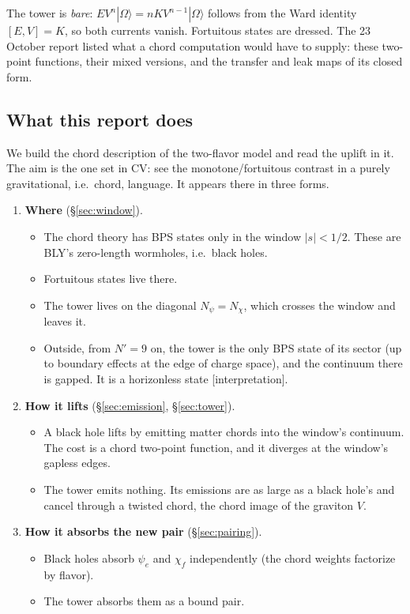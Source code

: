 \documentclass[11pt]{article}
\newcommand{\Np}{N'}
\newcommand{\Om}{|\Omega\rangle}
\newcommand{\tagbox}[2]{\textsf{\small\color{#1}[#2]}}
\newcommand{\INTERP}{\tagbox{cconj}{interpretation}}
\theoremstyle{plain}
\theoremstyle{remark}
\numberwithin{equation}{section}
\begin{document}
The tower is \emph{bare}: $E V^n\Om=nKV^{n-1}\Om$ follows from the Ward identity $[E,V]=K$, so both currents vanish.
Fortuitous states are dressed. The 23 October report listed what a chord computation would have to supply: these two-point
functions, their mixed versions, and the transfer and leak maps of its closed form.

\subsection{What this report does}

We build the chord description of the two-flavor model and read the uplift in it. The aim is the one set in CV: see the
monotone/fortuitous contrast in a purely gravitational, i.e.\ chord, language. It appears there in three forms.

\begin{enumerate}\itemsep2pt
\item \textbf{Where} (\S\ref{sec:window}).
  \begin{itemize}\itemsep1pt
  \item The chord theory has BPS states only in the window $|s|<1/2$. These are BLY's zero-length wormholes, i.e.\ black
    holes.
  \item Fortuitous states live there.
  \item The tower lives on the diagonal $N_\psi=N_\chi$, which crosses the window and leaves it.
  \item Outside, from $\Np=9$ on, the tower is the only BPS state of its sector (up to boundary effects at the edge of
    charge space), and the continuum there is gapped. It is a horizonless state \INTERP.
  \end{itemize}
\item \textbf{How it lifts} (\S\ref{sec:emission}, \S\ref{sec:tower}).
  \begin{itemize}\itemsep1pt
  \item A black hole lifts by emitting matter chords into the window's continuum. The cost is a chord two-point
    function, and it diverges at the window's gapless edges.
  \item The tower emits nothing. Its emissions are as large as a black hole's and cancel through a twisted chord, the chord
    image of the graviton $V$.
  \end{itemize}
\item \textbf{How it absorbs the new pair} (\S\ref{sec:pairing}).
  \begin{itemize}\itemsep1pt
  \item Black holes absorb $\psi_e$ and $\chi_f$ independently (the chord weights factorize by flavor).
  \item The tower absorbs them as a bound pair.
  \end{itemize}
\end{enumerate}
\end{document}
